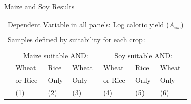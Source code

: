 \documentclass[10pt, xcolor=dvipsnames]{beamer}
\begin{document}
\begin{frame}{Maize and Soy Results}\label{othercrop}

{\footnotesize
\begin{tabularx}{\textwidth}{lXXXXXX}
\midrule
\multicolumn{7}{l}{Dependent Variable in all panels: Log caloric yield ($A_{isc}$)} \\ \\
\multicolumn{7}{l}{Samples defined by suitability for each crop:} \\ \\
 & \multicolumn{3}{c}{Maize suitable AND:} & \multicolumn{3}{c}{Soy suitable AND:} \\ \cmidrule(lr){2-4} \cmidrule(lr){5-7}
 & Wheat & Rice & Wheat  & Wheat  & Rice  & Wheat \\
 & or Rice & Only & Only & or Rice & Only & Only   \\
 & (1) & (2) & (3) & (4) & (5) & (6) \\
\midrule

\midrule
\end{tabularx}
}

\hfill \hyperlink{robustness}{}
\end{frame}
\end{document}
